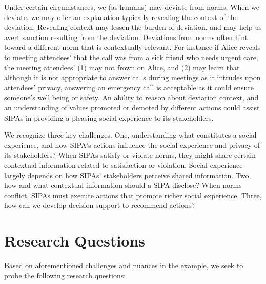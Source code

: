 \documentclass[11pt,          %
               phd,           %
               onehalfspacing %
               ]{ncsuthesis}
\begin{document}
Under certain circumstances, we (as humans) may deviate from norms. When
we deviate, we may offer an explanation typically revealing the context
of the deviation. Revealing context may lessen the burden of deviation,
and may help us avert sanction resulting from the deviation. Deviations
from norms often hint toward a different norm that is contextually
relevant. For instance if Alice reveals to meeting attendees' that the
call was from a sick friend who needs urgent care, the meeting
attendees' (1) may not frown on Alice, and (2) may learn that although
it is not appropriate to answer calls during meetings as it intrudes
upon attendees' privacy, answering an emergency call is acceptable as it
could ensure someone's well being or safety. An ability to reason about
deviation context, and an understanding of values promoted or demoted by different
actions could assist SIPAs in providing a pleasing social experience to
its stakeholders.

We recognize three key challenges. One, understanding what constitutes a
social experience, and how SIPA's actions influence the social
experience and privacy of its stakeholders? When SIPAs satisfy or violate
norms, they might share certain contextual information related to
satisfaction or violation. Social experience largely depends on how
SIPAs' stakeholders perceive shared information. Two, how and what
contextual information should a SIPA disclose? When norms conflict,
SIPAs must execute actions that promote richer social experience. Three,
how can we develop decision support to recommend actions?

\section{Research Questions}
\label{sec:intro-questions}

Based on aforementioned challenges and nuances in the example, we seek 
to probe the following research questions: 
\end{document}
